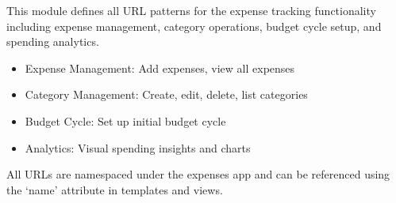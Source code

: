 \documentclass[letterpaper,10pt,english]{sphinxmanual}
\begin{document}
\sphinxAtStartPar
This module defines all URL patterns for the expense tracking functionality
including expense management, category operations, budget cycle setup,
and spending analytics.
\begin{description}
\begin{itemize}
\item {} 
\sphinxAtStartPar
Expense Management: Add expenses, view all expenses

\item {} 
\sphinxAtStartPar
Category Management: Create, edit, delete, list categories

\item {} 
\sphinxAtStartPar
Budget Cycle: Set up initial budget cycle

\item {} 
\sphinxAtStartPar
Analytics: Visual spending insights and charts

\end{itemize}

\end{description}

\sphinxAtStartPar
All URLs are namespaced under the expenses app and can be referenced
using the ‘name’ attribute in templates and views.
\end{document}
